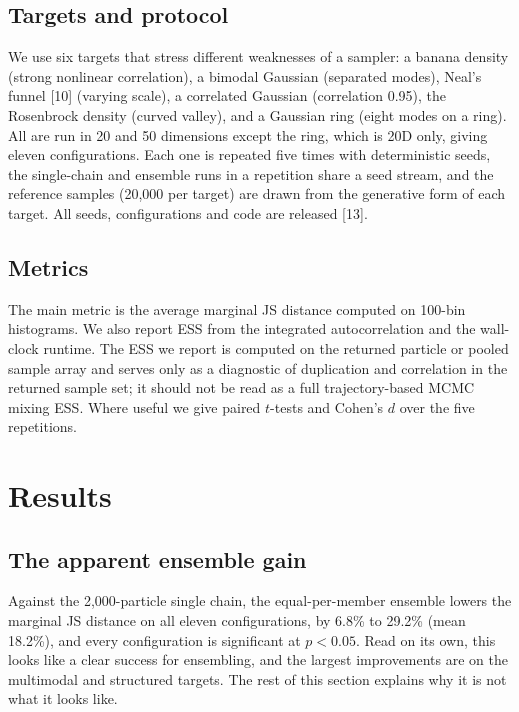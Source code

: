 \documentclass[11pt]{article}
\begin{document}
\subsection{Targets and protocol}
We use six targets that stress different weaknesses of a sampler: a banana
density (strong nonlinear correlation), a bimodal Gaussian (separated modes),
Neal's funnel [10] (varying scale), a correlated Gaussian (correlation 0.95),
the Rosenbrock density (curved valley), and a Gaussian ring (eight modes on a
ring). All are run in 20 and 50 dimensions except the ring, which is 20D only,
giving eleven configurations. Each one is repeated five times with
deterministic seeds, the single-chain and ensemble runs in a repetition share
a seed stream, and the reference samples (20,000 per target) are drawn from the
generative form of each target. All seeds, configurations and code are
released [13].

\subsection{Metrics}
The main metric is the average marginal JS distance computed on 100-bin
histograms. We also report ESS from the integrated autocorrelation and the
wall-clock runtime. The ESS we report is computed on the returned particle or pooled sample array and serves only as a diagnostic of duplication and correlation in the returned sample set; it should not be read as a full trajectory-based MCMC mixing ESS. Where useful we give paired $t$-tests and Cohen's $d$ over
the five repetitions.

\section{Results}

\subsection{The apparent ensemble gain}
Against the 2,000-particle single chain, the equal-per-member ensemble lowers
the marginal JS distance on all eleven configurations, by 6.8\% to 29.2\%
(mean 18.2\%), and every configuration is significant at $p<0.05$. Read on its
own, this looks like a clear success for ensembling, and the largest
improvements are on the multimodal and structured targets. The rest of this
section explains why it is not what it looks like.
\end{document}
